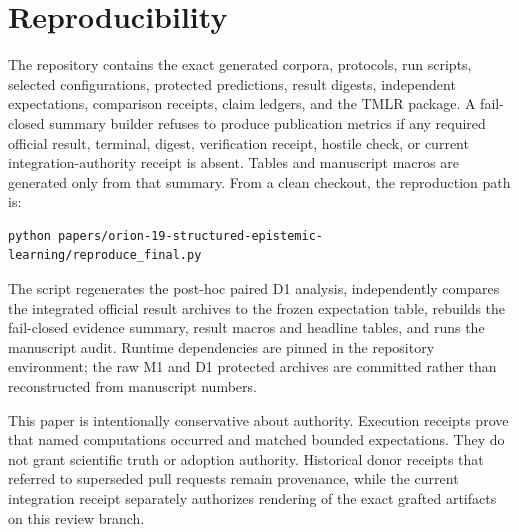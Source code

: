 \section{Reproducibility}

The repository contains the exact generated corpora, protocols, run scripts, selected configurations, protected predictions, result digests, independent expectations, comparison receipts, claim ledgers, and the TMLR package. A fail-closed summary builder refuses to produce publication metrics if any required official result, terminal, digest, verification receipt, hostile check, or current integration-authority receipt is absent. Tables and manuscript macros are generated only from that summary. From a clean checkout, the reproduction path is:

\begin{verbatim}
python papers/orion-19-structured-epistemic-learning/reproduce_final.py
\end{verbatim}

The script regenerates the post-hoc paired D1 analysis, independently compares the integrated official result archives to the frozen expectation table, rebuilds the fail-closed evidence summary, result macros and headline tables, and runs the manuscript audit. Runtime dependencies are pinned in the repository environment; the raw M1 and D1 protected archives are committed rather than reconstructed from manuscript numbers.

This paper is intentionally conservative about authority. Execution receipts prove that named computations occurred and matched bounded expectations. They do not grant scientific truth or adoption authority. Historical donor receipts that referred to superseded pull requests remain provenance, while the current integration receipt separately authorizes rendering of the exact grafted artifacts on this review branch.

